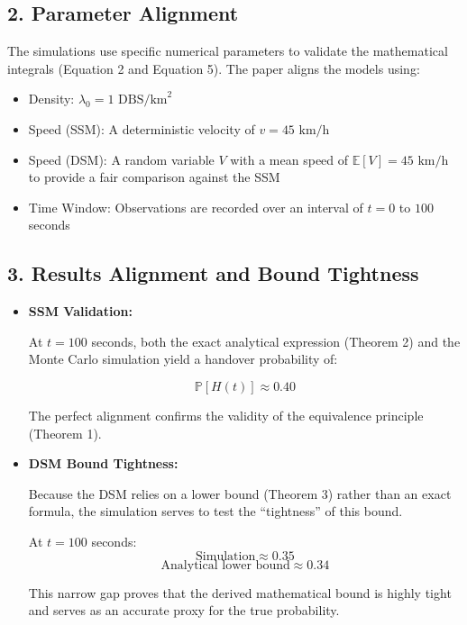\documentclass[12pt,a4paper]{article}
\begin{document}
\subsection{2. Parameter Alignment}

The simulations use specific numerical parameters to validate the mathematical integrals (Equation 2 and Equation 5). The paper aligns the models using:

\begin{itemize}
    \item Density: $\lambda_0 = 1 \text{ DBS/km}^2$
    \item Speed (SSM): A deterministic velocity of $v = 45 \text{ km/h}$
    \item Speed (DSM): A random variable $V$ with a mean speed of $\mathbb{E}[V] = 45 \text{ km/h}$ to provide a fair comparison against the SSM
    \item Time Window: Observations are recorded over an interval of $t = 0$ to $100$ seconds
\end{itemize}

\subsection{3. Results Alignment and Bound Tightness}

\begin{itemize}
    \item \textbf{SSM Validation:}

    At $t = 100$ seconds, both the exact analytical expression (Theorem 2) and the Monte Carlo simulation yield a handover probability of:

    \[
    \mathbb{P}[H(t)] \approx 0.40
    \]

    The perfect alignment confirms the validity of the equivalence principle (Theorem 1).

    \item \textbf{DSM Bound Tightness:}

    Because the DSM relies on a lower bound (Theorem 3) rather than an exact formula, the simulation serves to test the ``tightness'' of this bound.

    At $t = 100$ seconds:
    \[
    \text{Simulation} \approx 0.35
    \]
    \[
    \text{Analytical lower bound} \approx 0.34
    \]

    This narrow gap proves that the derived mathematical bound is highly tight and serves as an accurate proxy for the true probability.
\end{itemize}
\end{document}
